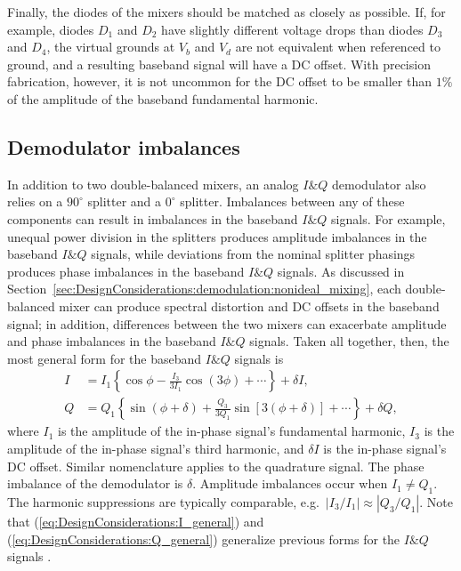 Finally, the diodes of the mixers should be matched as closely as possible.
If, for example, diodes $D_1$ and $D_2$
have slightly different voltage drops than diodes $D_3$ and $D_4$,
the virtual grounds at $V_b$ and $V_d$ are not equivalent
when referenced to ground, and
a resulting baseband signal will have a DC offset.
With precision fabrication, however,
it is not uncommon for the DC offset to be smaller than $1\%$
of the amplitude of the baseband fundamental harmonic.


\subsection{Demodulator imbalances}
\label{sec:DesignConsiderations:demodulation:demodulator_imbalances}
In addition to two double-balanced mixers,
an analog $I\&Q$ demodulator also relies on
a $90^{\circ}$ splitter and a $0^{\circ}$ splitter.
Imbalances between any of these components
can result in imbalances in the baseband $I\&Q$ signals.
For example, unequal power division in the splitters
produces amplitude imbalances in the baseband $I\&Q$ signals, while
deviations from the nominal splitter phasings
produces phase imbalances in the baseband $I\&Q$ signals.
As discussed in
Section~\ref{sec:DesignConsiderations:demodulation:nonideal_mixing},
each double-balanced mixer can produce
spectral distortion and DC offsets in the baseband signal;
in addition, differences between the two mixers
can exacerbate amplitude and phase imbalances
in the baseband $I\&Q$ signals.
Taken all together, then,
the most general form for the baseband $I\&Q$ signals is
\begin{align}
  I
  &=
  I_1 \left\{%
    \cos\phi
    -
    \frac{I_3}{3 I_1}
    \cos \left( 3 \phi \right)
    +
    \cdots
  \right\}
  +
  \delta I,
  \label{eq:DesignConsiderations:I_general}
  \\
  Q
  &=
  Q_1 \left\{%
    \sin \left( \phi + \delta \right)
    +
    \frac{Q_3}{3 Q_1}
    \sin \left[ 3 \left( \phi + \delta \right) \right]
    +
    \cdots
  \right\}
  +
  \delta Q,
  \label{eq:DesignConsiderations:Q_general}
\end{align}
where
$I_1$ is the amplitude of the in-phase signal's fundamental harmonic,
$I_3$ is the amplitude of the in-phase signal's third harmonic, and
$\delta I$ is the in-phase signal's DC offset.
Similar nomenclature applies to the quadrature signal.
The phase imbalance of the demodulator is $\delta$.
Amplitude imbalances occur when $I_1 \neq Q_1$.
The harmonic suppressions are typically comparable,
e.g.\ $|I_3 / I_1| \approx |Q_3 / Q_1|$.
Note that (\ref{eq:DesignConsiderations:I_general}) and
(\ref{eq:DesignConsiderations:Q_general})
generalize previous forms for the $I\&Q$ signals
\cite{vanzeeland_rsi04}.


